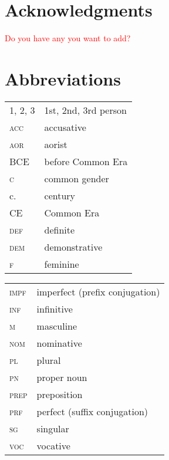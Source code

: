 \documentclass[output=paper]{langsci/langscibook}
\begin{document}
\section*{Acknowledgments}
\textcolor{red}{Do you have any you want to add?}

\section*{Abbreviations}

\begin{tabularx}{.5\textwidth}{@{}lQ@{}}
\textsc{1, 2, 3} & 1st, 2nd, 3rd person \\
\textsc{acc} & accusative \\
\textsc{aor} & aorist \\
BCE & before Common Era \\
\textsc{c} & common gender \\
c. & century \\
CE & Common Era \\
\textsc{def} & definite \\
\textsc{dem} & demonstrative \\
\textsc{f} & feminine \\
\end{tabularx}%
\begin{tabularx}{.5\textwidth}{@{}lQ@{}}
\textsc{impf} & imperfect (prefix conjugation) \\
\textsc{inf} & infinitive \\
\textsc{m} & masculine \\
\textsc{nom} & nominative \\
\textsc{pl} & plural \\
\textsc{pn} & proper noun \\
\textsc{prep} & preposition \\
\textsc{prf} & perfect (suffix conjugation) \\
\textsc{sg} & singular \\
\textsc{voc} & vocative \\
\end{tabularx}%


\sloppy
\printbibliography[heading=subbibliography,notkeyword=this] 
\end{document}
